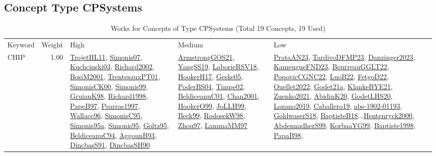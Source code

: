 \subsection{Concept Type CPSystems}
\label{sec:CPSystems}
\label{CPSystems}
{\scriptsize
\begin{longtable}{p{3cm}r>{\raggedright\arraybackslash}p{6cm}>{\raggedright\arraybackslash}p{6cm}>{\raggedright\arraybackslash}p{8cm}}
\rowcolor{white}\caption{Works for Concepts of Type CPSystems (Total 19 Concepts, 19 Used)}\\ \toprule
\rowcolor{white}Keyword & Weight & High & Medium & Low\\ \midrule\endhead
\bottomrule
\endfoot
\index{CHIP}\index{CPSystems!CHIP}CHIP &  1.00 & \hyperref[detail:TrojetHL11]{TrojetHL11}, \hyperref[detail:Simonis07]{Simonis07}, \hyperref[detail:Kuchcinski03]{Kuchcinski03}, \hyperref[detail:Richard2002]{Richard2002}, \hyperref[detail:BosiM2001]{BosiM2001}, \hyperref[detail:TrentesauxPT01]{TrentesauxPT01}, \hyperref[detail:SimonisCK00]{SimonisCK00}, \hyperref[detail:Simonis99]{Simonis99}, \hyperref[detail:GruianK98]{GruianK98}, \hyperref[detail:Richard1998]{Richard1998}, \hyperref[detail:PapeB97]{PapeB97}, \hyperref[detail:Psarras1997]{Psarras1997}, \hyperref[detail:Wallace96]{Wallace96}, \hyperref[detail:SimonisC95]{SimonisC95}, \hyperref[detail:Simonis95a]{Simonis95a}, \hyperref[detail:Simonis95]{Simonis95}, \hyperref[detail:Goltz95]{Goltz95}, \hyperref[detail:BeldiceanuC94]{BeldiceanuC94}, \hyperref[detail:AggounB93]{AggounB93}, \hyperref[detail:DincbasS91]{DincbasS91}, \hyperref[detail:DincbasSH90]{DincbasSH90} & \hyperref[detail:ArmstrongGOS21]{ArmstrongGOS21}, \hyperref[detail:YangSS19]{YangSS19}, \hyperref[detail:LaborieRSV18]{LaborieRSV18}, \hyperref[detail:HookerH17]{HookerH17}, \hyperref[detail:Geske05]{Geske05}, \hyperref[detail:PoderBS04]{PoderBS04}, \hyperref[detail:Timpe02]{Timpe02}, \hyperref[detail:BeldiceanuC01]{BeldiceanuC01}, \hyperref[detail:Chan2001]{Chan2001}, \hyperref[detail:HookerO99]{HookerO99}, \hyperref[detail:JoLLH99]{JoLLH99}, \hyperref[detail:Beck99]{Beck99}, \hyperref[detail:RodosekW98]{RodosekW98}, \hyperref[detail:Zhou97]{Zhou97}, \hyperref[detail:LammaMM97]{LammaMM97} & \hyperref[detail:PrataAN23]{PrataAN23}, \hyperref[detail:TardivoDFMP23]{TardivoDFMP23}, \hyperref[detail:Danzinger2023]{Danzinger2023}, \hyperref[detail:KameugneFND23]{KameugneFND23}, \hyperref[detail:BourreauGGLT22]{BourreauGGLT22}, \hyperref[detail:PopovicCGNC22]{PopovicCGNC22}, \hyperref[detail:LuoB22]{LuoB22}, \hyperref[detail:FetgoD22]{FetgoD22}, \hyperref[detail:Ouellet2022]{Ouellet2022}, \hyperref[detail:Godet21a]{Godet21a}, \hyperref[detail:KlankeBYE21]{KlankeBYE21}, \hyperref[detail:Zuenko2021]{Zuenko2021}, \hyperref[detail:AbidinK20]{AbidinK20}, \hyperref[detail:GodetLHS20]{GodetLHS20}, \hyperref[detail:Lozano2019]{Lozano2019}, \hyperref[detail:Caballero19]{Caballero19}, \hyperref[detail:abs-1902-01193]{abs-1902-01193}, \hyperref[detail:GoldwaserS18]{GoldwaserS18}, \hyperref[detail:BaptisteB18]{BaptisteB18}...\hyperref[detail:Hentenryck2000]{Hentenryck2000}, \hyperref[detail:AbdennadherS99]{AbdennadherS99}, \hyperref[detail:KorbaaYG99]{KorbaaYG99}, \hyperref[detail:Baptiste1998]{Baptiste1998}, \hyperref[detail:PapaB98]{PapaB98}, 
\end{longtable}}
